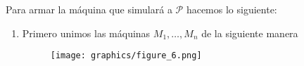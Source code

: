 \begin{frame}
  \PN Para armar la máquina que simulará a $\mathcal{P}$ hacemos lo siguiente:
  \begin{enumerate}[1)]
    \item Primero unimos las máquinas $M_{1}, \dotsc, M_{n}$ de la siguiente manera
      \begin{figure}[h]
        \centering
        \texttt{[image: graphics/figure\_6.png]}
      \end{figure}
  \end{enumerate}
\end{frame}
